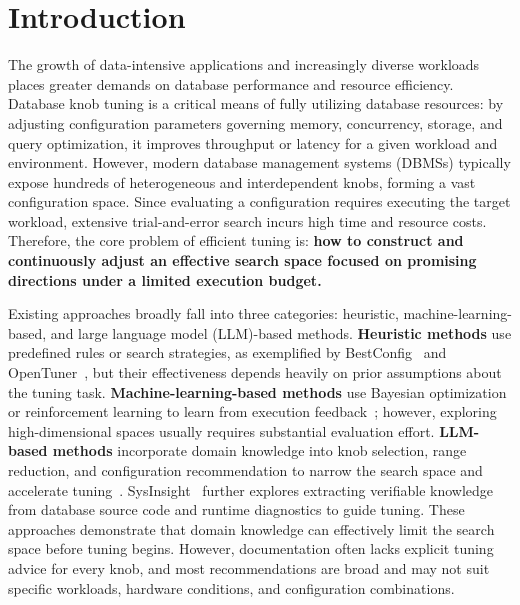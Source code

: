 \documentclass[runningheads]{llncs}
\begin{document}
\section{Introduction}

The growth of data-intensive applications and increasingly diverse
workloads places greater demands on database performance and resource
efficiency. Database knob tuning is a critical means of fully utilizing
database resources: by adjusting configuration parameters governing
memory, concurrency, storage, and query optimization, it improves
throughput or latency for a given workload and environment. However,
modern database management systems (DBMSs) typically expose hundreds of
heterogeneous and interdependent knobs, forming a vast configuration
space. Since evaluating a configuration requires executing the target
workload, extensive trial-and-error search incurs high time and resource
costs. Therefore, the core problem of efficient tuning is: \textbf{how to
construct and continuously adjust an effective search space focused on
promising directions under a limited execution budget.}

Existing approaches broadly fall into three categories: heuristic,
machine-learning-based, and large language model (LLM)-based methods.
\textbf{Heuristic methods} use predefined rules or search strategies, as
exemplified by BestConfig~\cite{bestconfig} and
OpenTuner~\cite{opentuner}, but their effectiveness depends heavily on
prior assumptions about the tuning task. \textbf{Machine-learning-based
methods} use Bayesian optimization or reinforcement learning to learn
from execution feedback~\cite{ottertune,ituned,cdbtune,qtune}; however,
exploring high-dimensional spaces usually requires substantial evaluation
effort. \textbf{LLM-based methods} incorporate domain knowledge into knob
selection, range reduction, and configuration recommendation to narrow
the search space and accelerate
tuning~\cite{gptuner,mctuner,agenttune}. SysInsight~\cite{sysinsight}
further explores extracting verifiable knowledge from database source
code and runtime diagnostics to guide tuning. These approaches
demonstrate that domain knowledge can effectively limit the search space
before tuning begins. However, documentation often lacks explicit tuning
advice for every knob, and most recommendations are broad and may not
suit specific workloads, hardware conditions, and configuration
combinations.
\end{document}
